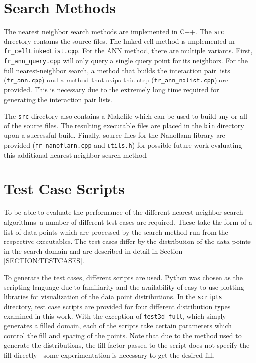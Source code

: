 \section{Search Methods}
\label{SECTION:SRC}

The nearest neighbor search methods are implemented in C++. The \texttt{src} directory contains the source files. The linked-cell method is implemented in \texttt{fr\_cellLinkedList.cpp}. For the ANN method, there are multiple variants. First, \texttt{fr\_ann\_query.cpp} will only query a single query point for its neighbors. For the full nearest-neighbor search, a method that builds the interaction pair lists (\texttt{fr\_ann.cpp}) and a method that skips this step (\texttt{fr\_ann\_nolist.cpp}) are provided. This is necessary due to the extremely long time required for generating the interaction pair lists.

The \texttt{src} directory also contains a Makefile which can be used to build any or all of the source files. The resulting executable files are placed in the \texttt{bin} directory upon a successful build. Finally, source files for the Nanoflann library are provided (\texttt{fr\_nanoflann.cpp} and \texttt{utils.h}) for possible future work evaluating this additional  nearest neighbor search method.

\section{Test Case Scripts}
\label{SECTION:TESTCASESCRIPTS}

To be able to evaluate the performance of the different nearest neighbor search algorithms, a number of different test cases are required. These take the form of a list of data points which are processed by the search method run from the respective executables. The test cases differ by the distribution of the data points in the search domain and are described in detail in Section \ref{SECTION:TESTCASES}.

To generate the test cases, different scripts are used. Python was chosen as the scripting language due to familiarity and the availability of easy-to-use plotting libraries for visualization of the data point distributions. In the \texttt{scripts} directory, test case scripts are provided for four different distribution types examined in this work. With the exception of \texttt{test3d\_full}, which simply generates a filled domain, each of the scripts take certain parameters which control the fill and spacing of the points.  Note that due to the method used to generate the distributions, the fill factor passed to the script does not specify the fill directly - some experimentation is necessary to get the desired fill. 

